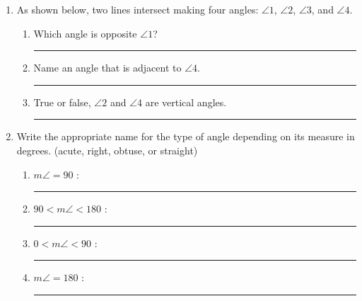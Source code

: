\begin{enumerate}
\item As shown below, two lines intersect making four angles: $\angle 1$, $\angle 2$, $\angle 3$, and $\angle 4$.
\begin{center}
\end{center}
\begin{enumerate}
\item Which angle is opposite $\angle 1$? \rule{4cm}{0.15mm} \bigskip
\item Name an angle that is adjacent to $\angle 4$. \rule{4cm}{0.15mm} \bigskip
\item True or false, $\angle 2$ and $\angle 4$ are vertical angles. \rule{3cm}{0.15mm}
\end{enumerate}

\newpage
\item Write the appropriate name for the type of angle depending on its measure in degrees. (acute, right, obtuse, or straight)
  \begin{enumerate}
    \item $m\angle = 90$ : \rule{4cm}{0.15mm} \bigskip
    \item $90 < m\angle < 180$ : \rule{4cm}{0.15mm} \bigskip
    \item $0< m\angle < 90$ : \rule{4cm}{0.15mm} \bigskip
    \item $m\angle = 180$ : \rule{4cm}{0.15mm} \bigskip
  \end{enumerate}


\end{enumerate}

